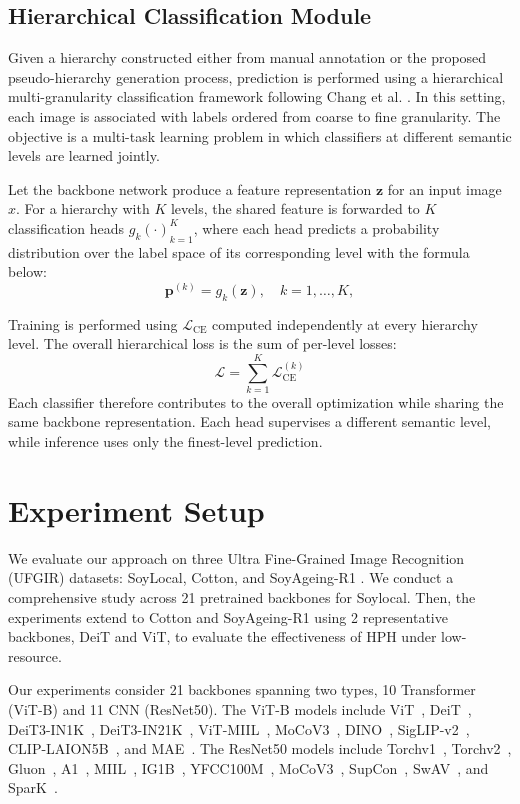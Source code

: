\documentclass[conference,a4paper]{IEEEtran}
\begin{document}
\subsection{Hierarchical Classification Module}
Given a hierarchy constructed either from manual annotation or the proposed pseudo-hierarchy generation process, prediction is performed using a hierarchical multi-granularity classification framework following Chang et al. \cite{chang_your_2021}. In this setting, each image is associated with labels ordered from coarse to fine granularity. The objective is a multi-task learning problem in which classifiers at different semantic levels are learned jointly.

Let the backbone network produce a feature representation $\mathbf{z}$ for an input image $x$. For a hierarchy with $K$ levels, the shared feature is forwarded to $K$ classification heads ${g_k(\cdot)}_{k=1}^{K}$, where each head predicts a probability distribution over the label space of its corresponding level with the formula below:
\[
\mathbf{p}^{(k)} = g_k(\mathbf{z}), \quad k = 1, \dots, K,
\]

Training is performed using $\mathcal{L}_{\text{CE}}$ computed independently at every hierarchy level. The overall hierarchical loss is the sum of per-level losses:
\[
\mathcal{L} = \sum_{k=1}^{K} \mathcal{L}_{\mathrm{CE}}^{(k)}
\]
Each classifier therefore contributes to the overall optimization while sharing the same backbone representation. Each head supervises a different semantic level, while inference uses only the finest-level prediction.

\section{Experiment Setup}
\label{sec_setup}

We evaluate our approach on three Ultra Fine-Grained Image Recognition (UFGIR) datasets: SoyLocal, Cotton, and SoyAgeing-R1 \cite{yu_benchmark_2021}. We conduct a comprehensive study across 21 pretrained backbones for Soylocal. Then, the experiments extend to Cotton and SoyAgeing-R1 using 2 representative backbones, DeiT and ViT, to evaluate the effectiveness of HPH under low-resource.

Our experiments consider 21 backbones spanning two types, 10 Transformer (ViT-B) and 11 CNN (ResNet50). The ViT-B models include ViT~\cite{dosovitskiy_image_2020}, DeiT~\cite{touvron_deit_2022}, DeiT3-IN1K~\cite{touvron_deit_2022}, DeiT3-IN21K~\cite{touvron_deit_2022}, ViT-MIIL~\cite{ridnik_imagenet-21k_2021}, MoCoV3~\cite{chen_empirical_2021}, DINO~\cite{caron_emerging_2021}, SigLIP-v2~\cite{tschannen_siglip_2025}, CLIP-LAION5B~\cite{cherti_reproducible_2023}, and MAE~\cite{he_masked_2021}.  The ResNet50 models include Torchv1~\cite{he_deep_2016}, Torchv2~\cite{he_deep_2016}, Gluon~\cite{he_bag_2018}, A1~\cite{wightman_resnet_2021}, MIIL~\cite{ridnik_imagenet-21k_2021}, IG1B~\cite{yalniz_billion-scale_2019}, YFCC100M~\cite{yalniz_billion-scale_2019}, MoCoV3~\cite{chen_empirical_2021}, SupCon~\cite{khosla_supervised_2021}, SwAV~\cite{caron_unsupervised_2021}, and SparK~\cite{tian_designing_2023}.
\end{document}
